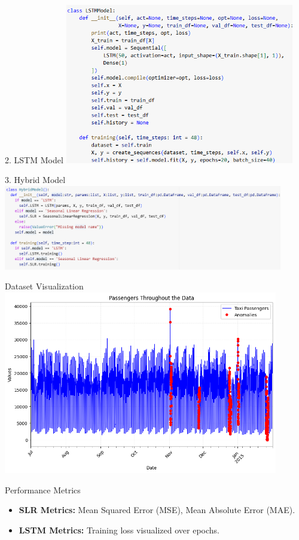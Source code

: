 \documentclass[10pt]{beamer}
\begin{document}
\begin{frame}{2. LSTM Model}
    \centering
    \includegraphics[height=7cm]{LSTM Model.png}
\end{frame}

\begin{frame}{3. Hybrid Model}
    \centering
    \includegraphics[height=3.7cm]{Hybrid Model.png}
\end{frame}

\begin{frame}{Dataset Visualization}
    \centering
    \includegraphics[height=8cm]{Taxi-Passengers-Graph}
\end{frame}

\begin{frame}{Performance Metrics}
    \begin{itemize}
        \item \textbf{SLR Metrics:} Mean Squared Error (MSE), Mean Absolute Error (MAE).
        \singlespacing
        \item \textbf{LSTM Metrics:} Training loss visualized over epochs.
    \end{itemize}
\end{frame}
\end{document}
